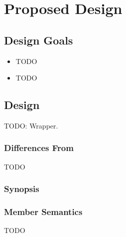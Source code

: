 \section{Proposed Design}

\subsection{Design Goals}

\begin{itemize}
  \item TODO

  \item TODO
\end{itemize}

\subsection{Design}

TODO: Wrapper.

\subsubsection{ Differences From}

TODO

\subsubsection{  Synopsis}
 


\subsubsection{ Member Semantics}

TODO
